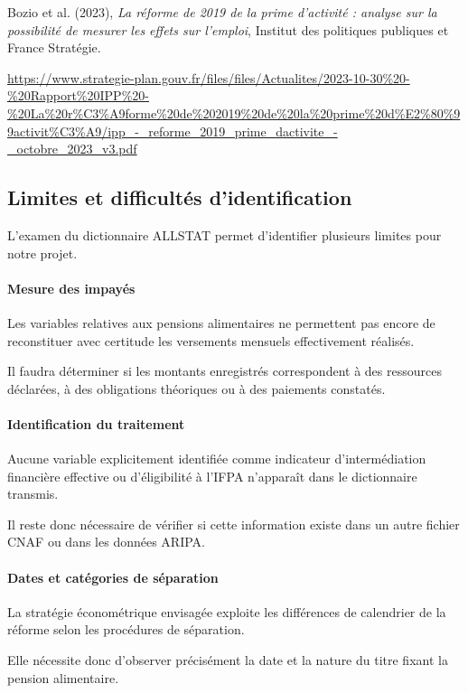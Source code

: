 \documentclass[11pt,a4paper]{article}
\begin{document}
Bozio et al. (2023),
\emph{La réforme de 2019 de la prime
d'activité : analyse sur la possibilité
de mesurer les effets sur l'emploi},
Institut des politiques publiques
et France Stratégie.

\medskip

\noindent
\url{https://www.strategie-plan.gouv.fr/files/files/Actualites/2023-10-30%20-%20Rapport%20IPP%20-%20La%20r%C3%A9forme%20de%202019%20de%20la%20prime%20d%E2%80%99activit%C3%A9/ipp_-_reforme_2019_prime_dactivite_-_octobre_2023_v3.pdf}

\subsection{Limites et difficultés d'identification}

L'examen du dictionnaire ALLSTAT
permet d'identifier plusieurs
limites pour notre projet.

\paragraph{Mesure des impayés}

Les variables relatives aux
pensions alimentaires ne
permettent pas encore de
reconstituer avec certitude
les versements mensuels
effectivement réalisés.

Il faudra déterminer
si les montants enregistrés
correspondent à des
ressources déclarées,
à des obligations théoriques
ou à des paiements constatés.

\paragraph{Identification du traitement}

Aucune variable explicitement
identifiée comme indicateur
d'intermédiation financière
effective ou d'éligibilité
à l'IFPA n'apparaît
dans le dictionnaire transmis.

Il reste donc nécessaire
de vérifier si cette
information existe
dans un autre fichier CNAF
ou dans les données ARIPA.

\paragraph{Dates et catégories de séparation}

La stratégie économétrique
envisagée exploite
les différences de calendrier
de la réforme selon
les procédures de séparation.

Elle nécessite donc
d'observer précisément
la date et la nature
du titre fixant
la pension alimentaire.
\end{document}
